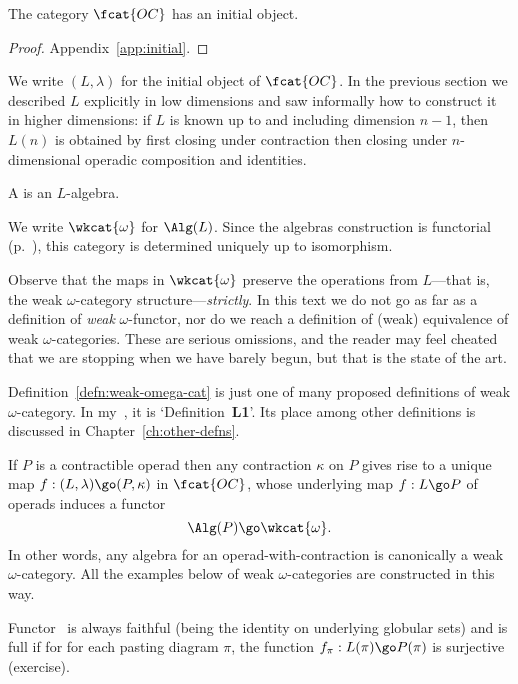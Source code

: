 \begin{propn}	
The category $\fcat{OC}$ has an initial object.
\end{propn}
%
\begin{proof}
Appendix~\ref{app:initial}. 
\done
\end{proof}
%
We write $(L, \lambda)$%
% 
% 
for the initial object of $\fcat{OC}$.  In the
previous section we described $L$ explicitly in low dimensions and saw
informally how to construct it in higher dimensions: if $L$ is known up to
and including dimension $n-1$, then $L(n)$ is obtained by first closing
under contraction then closing under $n$-dimensional operadic composition
and identities.

\begin{defn}	%
%
%
A  is an $L$-algebra.
\end{defn}
%
We write $\wkcat{\omega}$%
% 
% 
for $\Alg(L)$.  Since the algebras construction
is functorial (p.~\pageref{p:Alg-functorial}), this category is determined
uniquely up to isomorphism.  

Observe that the maps in $\wkcat{\omega}$ preserve the operations from
$L$---that is, the weak $\omega$-category structure---\emph{strictly}.%
%
%
%
%
 In
this text we do not go as far as a definition of \emph{weak}
$\omega$-functor, nor do we reach a definition of (weak) equivalence of
weak $\omega$-categories.  These are serious omissions, and the reader may
feel cheated that we are stopping when we have barely begun, but that is
the state of the art.

Definition~\ref{defn:weak-omega-cat} is just one of many proposed
definitions of weak $\omega$-category.  In my~\cite{SDN}, it is
`Definition~\textbf{L1}'.  Its place among other definitions is discussed
in Chapter~\ref{ch:other-defns}.

 
\begin{example}	
If $P$ is a contractible operad then any contraction $\kappa$ on $P$ gives
rise to a unique map $f: (L, \lambda) \go (P, \kappa)$ in $\fcat{OC}$,
whose underlying map $f: L \go P$ of operads induces a functor
%
\begin{equation}	\label{eq:P-omega-cat}
\Alg(P) \go \wkcat{\omega}.
\end{equation}
%
In other words, any algebra for an operad-with-contraction is canonically a
weak $\omega$-category.  All the examples below of weak $\omega$-categories
are constructed in this way.  

Functor~ is always faithful (being the identity on
underlying globular sets) and is full if for for each pasting diagram
$\pi$, the function $f_\pi: L(\pi) \go P(\pi)$ is surjective (exercise).
\end{example}

